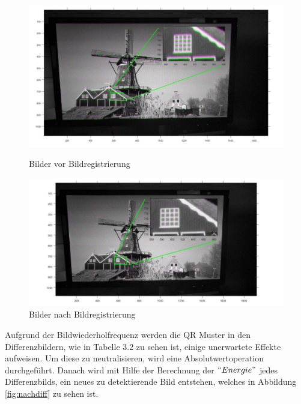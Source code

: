 \begin{figure}[H]
\centering 
\begin{minipage}[b]{0.49\textwidth} 
\centering 
\includegraphics[width=1.0\textwidth]{images/5_Implementirung/vorregistration.pdf} 
\caption{Bilder vor Bildregistrierung}
\label{fig:vorregistration}
\end{minipage}
\begin{minipage}[b]{0.49\textwidth} 
\centering 
\includegraphics[width=1.1\textwidth]{images/5_Implementirung/nachregis.pdf}
\caption{Bilder nach Bildregistrierung}
\label{fig:nachregis}
\end{minipage}
\end{figure}
 
Aufgrund der Bildwiederholfrequenz werden die QR Muster in den Differenzbildern, wie in Tabelle 3.2 zu sehen ist, einige unerwartete Effekte aufweisen. Um diese zu neutralisieren, wird eine Absolutwertoperation durchgeführt. Danach wird mit Hilfe der Berechnung der $ ``Energie" $ jedes Differenzbilds, ein neues zu detektierende Bild entstehen, welches in Abbildung \ref{fig:nachdiff} zu sehen ist. 

